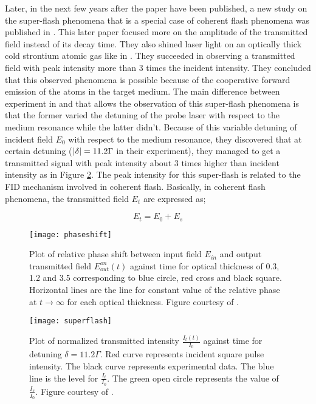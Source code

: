 Later, in the next few years after the paper \cite{Chalony2011} have been published, a new study on the super-flash phenomena that is a special case of coherent flash phenomena was published in \cite{Kwong2014}. This later paper focused more on the amplitude of the transmitted field instead of its decay time. They also shined laser light on an optically thick cold strontium atomic gas like in \cite{Chalony2011}. They succeeded in observing a transmitted field with peak intensity more than 3 times the incident intensity. They concluded that this observed phenomena is possible because of the cooperative forward emission of the atoms in the target medium. The main difference between experiment in \cite{Kwong2014} and \cite{Chalony2011} that allows the observation of this super-flash phenomena is that the former varied the detuning of the probe laser with respect to the medium resonance while the latter didn't. Because of this variable detuning of incident field $E_{0}$ with respect to the medium resonance, they discovered that at certain detuning ($\abs{\delta} = 11.2 \Gamma$ in their experiment), they managed to get a transmitted signal with peak intensity about 3 times higher than incident intensity as in Figure \ref{fig: superflash}. The peak intensity for this super-flash is related to the FID mechanism involved in coherent flash. Basically, in coherent flash phenomena, the transmitted field $E_{t}$ are expressed as;

\begin{equation}
    E_{t} = E_{0} + E_{s}
\end{equation}

\begin{figure}[h!]
    \centering
    \texttt{[image: phaseshift]}
    \caption{Plot of relative phase shift between input field $E_{in}$ and output transmitted field $E_{out}^{on}(t)$ against time for optical thickness of 0.3, 1.2 and 3.5 corresponding to blue circle, red cross and black square. Horizontal lines are the line for constant value of the relative phase at $t \rightarrow \infty$ for each optical thickness. Figure courtesy of \cite{Chalony2011}.}
    \label{fig: relative phase}
\end{figure}

\begin{figure}[h!]
    \centering
    \texttt{[image: superflash]}
    \caption{Plot of normalized transmitted intensity $\frac{I_{t}(t)}{I_{0}}$ against time for detuning $\delta = 11.2\Gamma$. Red curve represents incident square pulse intensity. The black curve represents experimental data. The blue line is the level for $\frac{I_t}{I_0}$. The green open circle represents the value of $\frac{I_{s}}{I_{0}}$. Figure courtesy of \cite{Kwong2014}.}
    \label{fig: superflash}
\end{figure}

